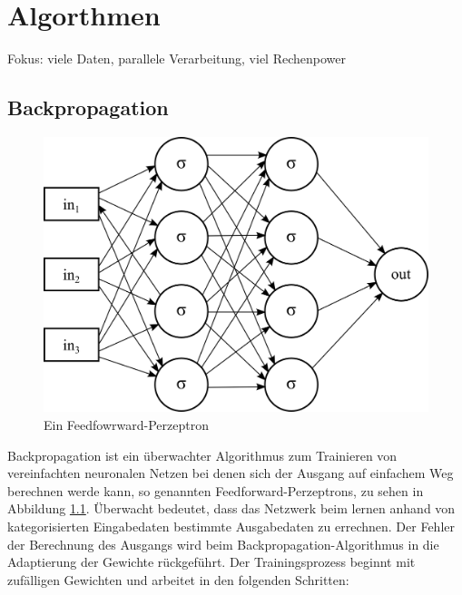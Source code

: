 \chapter{Algorthmen}
\label{cha:algorithmen}


Fokus: viele Daten, parallele Verarbeitung, viel Rechenpower

\section{Backpropagation}

\begin{figure}
	\centering
	\includegraphics[scale=1]{images/net-for-bp.png}
	\caption{Ein Feedfowrward-Perzeptron}
	\label{fig:net-for-bp}
\end{figure}

Backpropagation ist ein überwachter Algorithmus zum Trainieren von vereinfachten neuronalen Netzen bei denen sich der Ausgang auf einfachem Weg berechnen werde kann, so genannten Feedforward-Perzeptrons, zu sehen in Abbildung \ref{fig:net-for-bp}. Überwacht bedeutet, dass das Netzwerk beim lernen anhand von kategorisierten Eingabedaten bestimmte Ausgabedaten zu errechnen. Der Fehler der Berechnung des Ausgangs wird beim Backpropagation-Algorithmus in die Adaptierung der Gewichte rückgeführt. Der Trainingsprozess beginnt mit zufälligen Gewichten und arbeitet in den folgenden Schritten:

